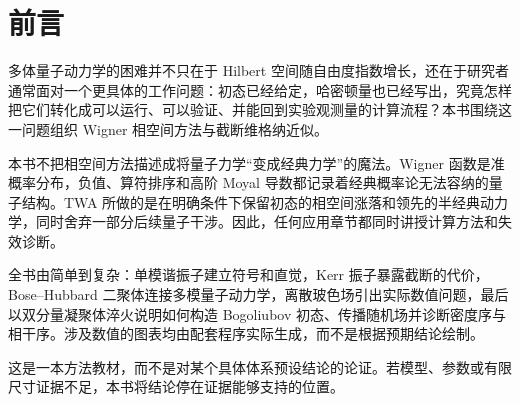 \chapter*{前言}

多体量子动力学的困难并不只在于 Hilbert 空间随自由度指数增长，还在于研究者通常面对一个更具体的工作问题：初态已经给定，哈密顿量也已经写出，究竟怎样把它们转化成可以运行、可以验证、并能回到实验观测量的计算流程？本书围绕这一问题组织 Wigner 相空间方法与截断维格纳近似。

本书不把相空间方法描述成将量子力学“变成经典力学”的魔法。Wigner 函数是准概率分布，负值、算符排序和高阶 Moyal 导数都记录着经典概率论无法容纳的量子结构。TWA 所做的是在明确条件下保留初态的相空间涨落和领先的半经典动力学，同时舍弃一部分后续量子干涉。因此，任何应用章节都同时讲授计算方法和失效诊断。

全书由简单到复杂：单模谐振子建立符号和直觉，Kerr 振子暴露截断的代价，Bose--Hubbard 二聚体连接多模量子动力学，离散玻色场引出实际数值问题，最后以双分量凝聚体淬火说明如何构造 Bogoliubov 初态、传播随机场并诊断密度序与相干序。涉及数值的图表均由配套程序实际生成，而不是根据预期结论绘制。

这是一本方法教材，而不是对某个具体体系预设结论的论证。若模型、参数或有限尺寸证据不足，本书将结论停在证据能够支持的位置。
